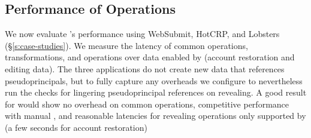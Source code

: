 
\subsection{Performance of \sys Operations}
\label{s:eval-ops}

%
We now evaluate \sys's performance using WebSubmit,
HotCRP, and Lobsters (\S\ref{s:case-studies}).
%
%
We measure the latency of common operations, \xxing transformations,
and operations over \xxed data enabled by \sys
(\eg account restoration and editing \xxed data).
%
The three applications do not create new data that references pseudoprincipals,
but to fully capture any overheads we configure \sys to nevertheless run the
checks for lingering pseudoprincipal references on revealing.
%
A good result for \sys would show no overhead on common operations,
competitive performance with manual \xxing, and reasonable
latencies for revealing operations only supported by \sys
(\eg a few seconds for account restoration)
%

